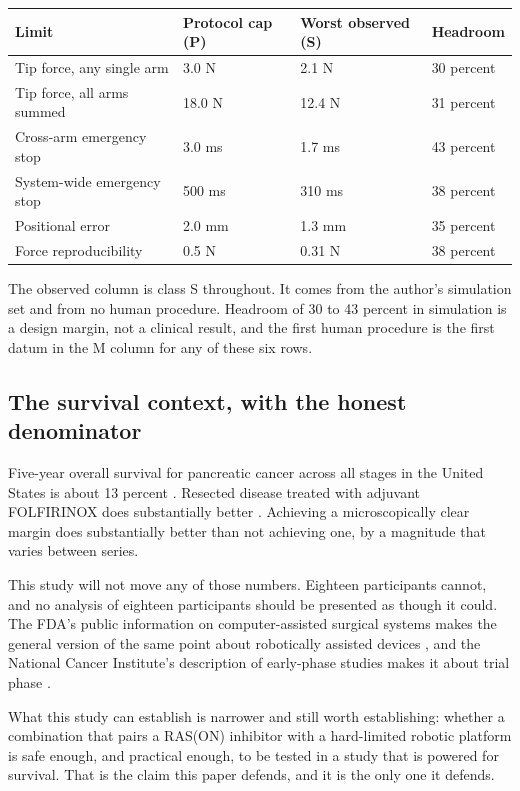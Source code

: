 \noindent\begin{tabularx}{\textwidth}{L{4.4cm} C{2.4cm} C{2.4cm} Y}
\toprule
\textbf{Limit} & \textbf{Protocol cap (P)} & \textbf{Worst observed (S)} & \textbf{Headroom} \\
\midrule
Tip force, any single arm & 3.0 N & 2.1 N & 30 percent \\
Tip force, all arms summed & 18.0 N & 12.4 N & 31 percent \\
Cross-arm emergency stop & 3.0 ms & 1.7 ms & 43 percent \\
System-wide emergency stop & 500 ms & 310 ms & 38 percent \\
Positional error & 2.0 mm & 1.3 mm & 35 percent \\
Force reproducibility & 0.5 N & 0.31 N & 38 percent \\
\bottomrule
\end{tabularx}

\vspace{0.30em}

\noindent The observed column is class S throughout. It comes from the author's
simulation set \cite{pdac060s2030} and from no human procedure. Headroom of 30
to 43 percent in simulation is a design margin, not a clinical result, and the
first human procedure is the first datum in the M column for any of these six
rows.

\subsection{The survival context, with the honest denominator}

Five-year overall survival for pancreatic cancer across all stages in the United
States is about 13 percent \cite{Siegel2025}. Resected disease treated with
adjuvant FOLFIRINOX does substantially better \cite{Conroy2018}. Achieving a
microscopically clear margin does substantially better than not achieving one,
by a magnitude that varies between series.

This study will not move any of those numbers. Eighteen participants cannot, and
no analysis of eighteen participants should be presented as though it could. The
FDA's public information on computer-assisted surgical systems makes the general
version of the same point about robotically assisted devices
\cite{FDARobot2022}, and the National Cancer Institute's description of
early-phase studies makes it about trial phase \cite{NCITrial2024}.

What this study can establish is narrower and still worth establishing: whether
a combination that pairs a RAS(ON) inhibitor with a hard-limited robotic
platform is safe enough, and practical enough, to be tested in a study that is
powered for survival. That is the claim this paper defends, and it is the only
one it defends.


